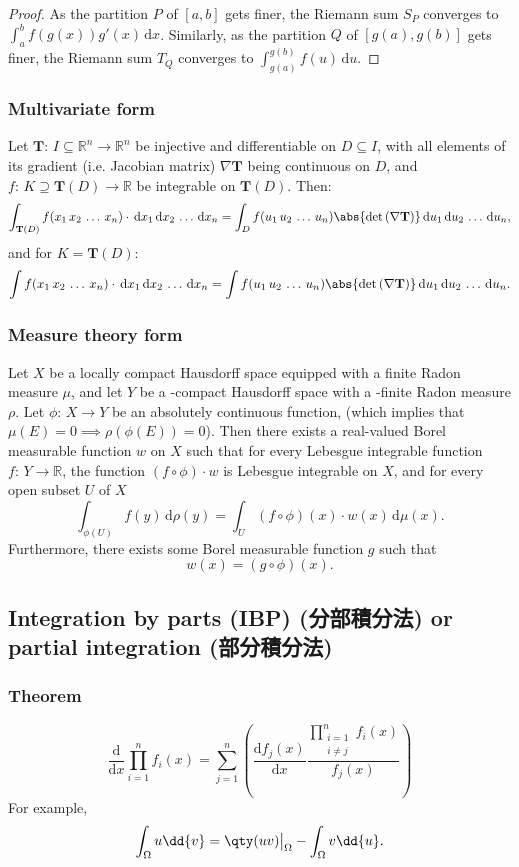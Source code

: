 \documentclass[a4paper,12pt]{report}
\begin{document}
\begin{itemize}
\begin{itemize}
\begin{proof}
As the partition \(P\) of \([a, b]\) gets finer, the Riemann sum \(S_P\) converges to \(\int_a^b f(g(x)) g'(x) \, \mathrm{d}x\). Similarly, as the partition \(Q\) of \([g(a), g(b)]\) gets finer, the Riemann sum \(T_Q\) converges to \(\int_{g(a)}^{g(b)} f(u) \, \mathrm{d}u\).
\end{proof}
\subsubsection{Multivariate form}
Let $\mathbf{T}:\,I\subseteq\mathbb{R}^n\to\mathbb{R}^n$ be injective and differentiable on $D\subseteq I$, with all elements of its gradient (i.e. Jacobian matrix) $\nabla\mathbf{T}$ being continuous on $D$, and $f:\,K\supseteq\mathbf{T}(D)\to\mathbb{R}$ be integrable on $\mathbf{T}(D)$. Then:
\[\int_{\mathbf{T}(D)}f(x_1\,x_2\,\dots\,x_n)\cdot\,\mathrm{d}x_1\,\mathrm{d}x_2\,\dots\,\mathrm{d}x_n=\int_D f(u_1\,u_2\,\dots\,u_n)\abs{\det\left(\nabla\mathbf{T}\right)}\,\mathrm{d}u_1\,\mathrm{d}u_2\,\dots\,\mathrm{d}u_n,\]
and for $K=\mathbf{T}(D)$:
\[\int f(x_1\,x_2\,\dots\,x_n)\cdot\,\mathrm{d}x_1\,\mathrm{d}x_2\,\dots\,\mathrm{d}x_n=\int f(u_1\,u_2\,\dots\,u_n)\abs{\det\left(\nabla\mathbf{T}\right)}\,\mathrm{d}u_1\,\mathrm{d}u_2\,\dots\,\mathrm{d}u_n.\]
\subsubsection{Measure theory form}
Let $X$ be a locally compact Hausdorff space equipped with a finite Radon measure $μ$, and let $Y$ be a \text{\textsigma}-compact Hausdorff space with a \text{\textsigma}-finite Radon measure $\rho$. Let $\phi:\,X\to Y$ be an absolutely continuous function, (which implies that $\mu(E)=0\implies\rho(\phi(E))=0$). Then there exists a real-valued Borel measurable function $w$ on $X$ such that for every Lebesgue integrable function $f:\,Y\to\mathbb{R}$, the function $(f\circ\phi)\cdot w$ is Lebesgue integrable on $X$, and for every open subset $U$ of $X$
\[\int_{\phi(U)}f(y)\,\mathrm{d}\rho(y)=\int_U(f\circ\phi)(x)\cdot w(x)\,\mathrm{d}\mu(x).\]
Furthermore, there exists some Borel measurable function $g$ such that 
\[w(x)=(g\circ\phi)(x).\]
\subsection{Integration by parts (IBP) (分部積分法) or partial integration (部分積分法)}
\subsubsection{Theorem}
\[\frac{\mathrm{d}}{\mathrm{d}x}\prod_{i=1}^nf_i(x)=\sum_{j=1}^n\left(\frac{\mathrm{d}f_j(x)}{\mathrm{d}x}\frac{\prod_{\substack{i=1\\i\neq j}}^n f_i(x)}{f_j(x)}\right)\]
For example,
\[\int_{\Omega} u\dd{v} = \qty(u v)\big\vert_{\Omega} - \int_{\Omega} v\dd{u}.\]

\end{itemize}
\end{itemize}
\end{document}
